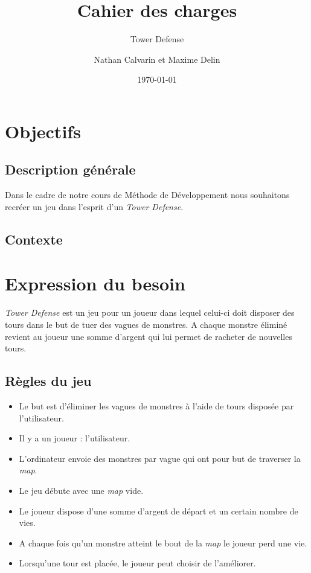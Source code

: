 \documentclass{scrartcl}
\title{Cahier des charges}
\author{Nathan Calvarin et Maxime Delin}
\subtitle{Tower Defense}
\date{\today}
\begin{document}
\maketitle
\tableofcontents
\newpage

\section{Objectifs}
	\subsection{Description générale}
	Dans le cadre de notre cours de Méthode de Développement nous souhaitons recréer un jeu dans l'esprit d'un \emph{Tower Defense}.
	\subsection{Contexte}
\section{Expression du besoin}
\emph{Tower Defense} est un jeu pour un joueur dans lequel celui-ci doit disposer des tours dans le but de tuer des vagues de monstres. A chaque monstre éliminé revient au joueur une somme d'argent qui lui permet de racheter de nouvelles tours. 
	\subsection{Règles du jeu}
	\begin{itemize}
	\item Le but est d'éliminer les vagues de monstres à l'aide de tours disposée par l'utilisateur.
	\item Il y a un joueur : l'utilisateur.
	\item L'ordinateur envoie des monstres par vague qui ont pour but de traverser la \emph{map}.
	\item Le jeu débute avec une \emph{map} vide.
	\item Le joueur dispose d'une somme d'argent de départ et un certain nombre de vies.
	\item A chaque fois qu'un monstre atteint le bout de la \emph{map} le joueur perd une vie.
	\item Lorsqu'une tour est placée, le joueur peut choisir de l'améliorer.
	\end{itemize}
\end{document}
